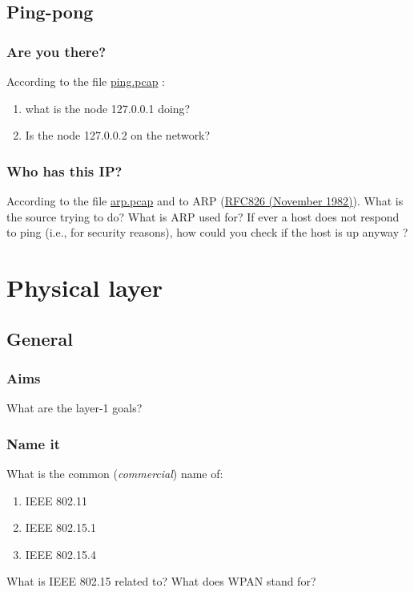 \documentclass[11pt]{article}
\begin{document}
\subsection{Ping-pong}
\subsubsection{Are you there?}
According to the file \color{blue}\href{http://teaching.auzias.net/db/ping.pcap}{ping.pcap} \color{black}:
  \begin{enumerate}
    \item what is the node 127.0.0.1 doing?
    \item Is the node 127.0.0.2 on the network?
  \end{enumerate}
\subsubsection{Who has this IP?}
According to the file \color{blue}\href{http://teaching.auzias.net/db/arp.pcap}{arp.pcap} \color{black} and to ARP (\color{blue}\href{http://tools.ietf.org/html/rfc826}{RFC826 (November 1982)})\color{black}. What is the source trying to do? What is ARP used for? If ever a host does not respond to ping (i.e., for security reasons), how could you check if the host is up anyway ?


\section{Physical layer}
\subsection{General}
\subsubsection{Aims}
What are the layer-1 goals?
\subsubsection{Name it}
What is the common (\emph{commercial}) name of:
  \begin{enumerate}
    \item IEEE 802.11
    \item IEEE 802.15.1
    \item IEEE 802.15.4
  \end{enumerate}
What is IEEE 802.15 related to? What does WPAN stand for?
\end{document}
